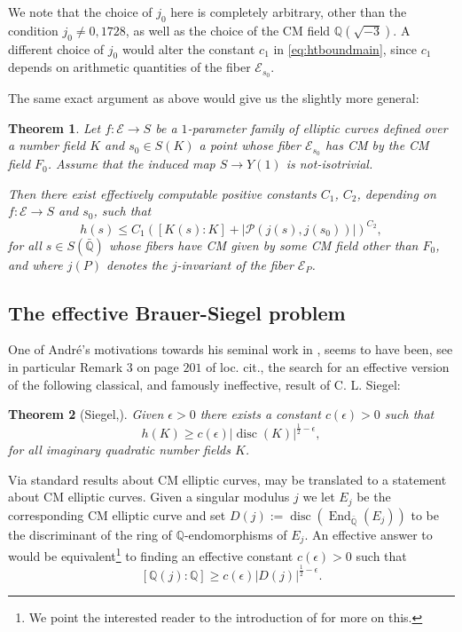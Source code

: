 \documentclass[12pt,twoside,a4paper]{article}
\theoremstyle{plain}%
\newtheorem{theorem}{Theorem}[section] %
\DeclareMathOperator{\End}{End}
\DeclareMathOperator{\disc}{disc}
\newcommand{\Q}{\mathbb{Q}}
\newcommand{\CE}{\mathcal{E}}
\newcommand{\CP}{\mathcal{P}}
\begin{document}
	We note that the choice of $j_0$ here is completely arbitrary, other than the condition $j_0\neq 0,1728$, as well as the choice of the CM field $\Q(\sqrt{-3})$. A different choice of $j_0$ would alter the constant $c_1$ in \eqref{eq:htboundmain}, since $c_1$ depends on arithmetic quantities of the fiber $\CE_{s_0}$.
	
The same exact argument as above would give us the slightly more general:
\begin{theorem}\label{htboundgfunsgeneral}
	Let $f:\CE\rightarrow S$ be a $1$-parameter family of elliptic curves defined over a number field $K$ and $s_0\in S(K)$ a point whose fiber $\CE_{s_0}$ has CM by the CM field $F_0$. Assume that the induced map $S\rightarrow Y(1)$ is not-isotrivial. 
	
	Then there exist effectively computable positive constants $C_1$, $C_2$, depending on $f:\CE\rightarrow S$ and $s_0$, such that 	
	\begin{equation}
		h(s)\leq C_1 ([K(s):K]+|\CP(j(s),j(s_0))|)^{C_2},
	\end{equation}for all $s\in S(\bar{\Q})$ whose fibers have CM given by some CM field other than $F_0$, and where $j(P)$ denotes the $j$-invariant of the fiber $\CE_P$.
\end{theorem}

\subsection{The effective Brauer-Siegel problem}\label{section:brauersiegel}

 One of Andr\'e's motivations towards his seminal work in \cite{andre1989g}, seems to have been, see in particular Remark $3$ on page $201$ of loc. cit., the search for an effective version of the following classical, and famously ineffective, result of C. L. Siegel:
\begin{theorem}[Siegel,\cite{siegelog}]\label{siegelogthm}Given $\epsilon>0$ there exists a constant $c(\epsilon)>0$ such that 
	\begin{equation}\label{eq:siegeleq}
		h(K)\geq c(\epsilon) |\disc(K)|^{\frac{1}{2}-\epsilon},
	\end{equation}for all imaginary quadratic number fields $K$.
\end{theorem}

Via standard results about CM elliptic curves,  may be translated to a statement about CM elliptic curves. Given a singular modulus $j$ we let $E_j$ be the corresponding CM elliptic curve and set $D(j):=\disc(\End_{\bar{\Q}}(E_j))$ to be the discriminant of the ring of $\Q$-endomorphisms of $E_j$. An effective answer to  would be equivalent\footnote{We point the interested reader to the introduction of \cite{papaseffbrsieg} for more on this.} to finding an effective constant $c(\epsilon)>0$ such that 
\begin{equation}\label{eq:siegelrestated}
	[\Q(j):\Q]\geq c(\epsilon) |D(j)|^{\frac{1}{2}-\epsilon}.
\end{equation}
\end{document}
